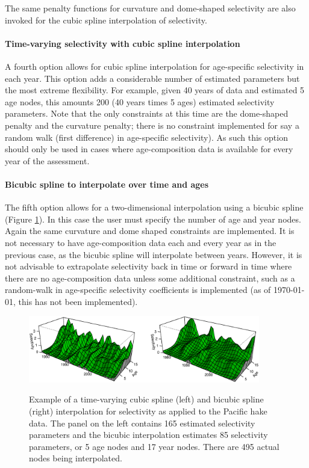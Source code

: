 \begin{multicols}{2}
The same penalty functions for curvature and dome-shaped selectivity are also invoked for the cubic spline interpolation of selectivity.

\paragraph{Time-varying selectivity with cubic spline interpolation} A fourth option allows for cubic spline interpolation for age-specific selectivity  in each year.  This option adds a considerable number of estimated parameters but the most extreme flexibility.  For example, given 40 years of data and estimated 5 age nodes, this amounts 200 (40 years times 5 ages) estimated selectivity parameters.  Note that the only constraints at this time are the dome-shaped penalty and the curvature penalty; there is no constraint implemented for say a random walk (first difference) in age-specific selectivity).  As such this option should only be used in cases where age-composition data is available for every year of the assessment.

\paragraph{Bicubic spline to interpolate over time and ages}  The fifth option allows for a two-dimensional interpolation using a bicubic spline (Figure \ref{Fig3}).  In this case the user must specify the number of age and year nodes.  Again the same curvature and dome shaped constraints are implemented.  It is not necessary to have age-composition data each and every year as in the previous case, as the bicubic spline will interpolate between years.  However, it is not advisable to extrapolate selectivity back in time or forward in time where there are no age-composition data unless some additional constraint, such as a random-walk in age-specific selectivity coefficients is implemented (as of \today, this has not been implemented).

\begin{figure}[!tbp]
    \centering
    \includegraphics[width=0.9\textwidth]{iscamFigs/BicubicEg.eps}\\
    \caption{Example of a time-varying cubic spline (left) and bicubic spline (right) interpolation for selectivity as applied to the Pacific hake data. The panel on the left contains 165 estimated selectivity parameters and the bicubic interpolation estimates 85 selectivity parameters, or 5 age nodes and 17 year nodes. There are 495 actual nodes being interpolated.}\label{Fig3}
\end{figure}


\end{multicols}
